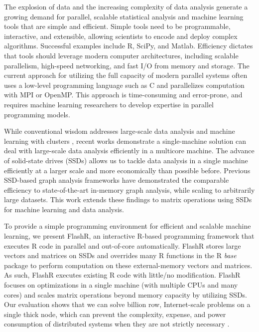 
The explosion of data and the increasing complexity of data analysis
generate a growing demand for parallel, scalable statistical analysis
and machine learning tools that are simple and efficient.
Simple tools need to be programmable, interactive, and extensible, 
allowing scientists to encode and deploy complex algorithms. 
Successful examples include R, SciPy, and Matlab.  Efficiency dictates that
tools should leverage modern computer architectures, including scalable
parallelism, high-speed networking, and fast I/O from memory and storage.
The current approach for utilizing the full
capacity of modern parallel systems often uses a low-level programming
language such as C and parallelizes computation with MPI or OpenMP.
This approach is time-consuming and error-prone, and requires machine learning
researchers to develop expertise in parallel programming models.
 

While conventional wisdom addresses large-scale data analysis and machine
learning with clusters
\cite{mapreduce,spark,systemml,tensorflow,petuum,graphlab}, recent works
\cite{flashgraph,gridgraph,Matveev17,hotos} demonstrate a single-machine
solution can deal with large-scale data analysis efficiently in a multicore
machine. The advance of solid-state drives (SSDs) allows us to tackle data
analysis in a single machine efficiently at a larger scale and more economically
than possible before. Previous SSD-based graph analysis frameworks
\cite{flashgraph, gridgraph, graphene}
have demonstrated the comparable efficiency to state-of-the-art in-memory graph
analysis, while scaling to arbitrarily large datasets. This work extends
these findings to matrix operations using SSDs for machine learning and
data analysis.


To provide a simple programming environment for efficient and scalable machine
learning, we present FlashR, an interactive R-based programming framework that
executes R code in parallel and out-of-core automatically. FlashR stores large
vectors and matrices on SSDs and overrides many R functions in the R
\textit{base} package to perform computation on these external-memory vectors
and matrices.
As such, FlashR executes existing R code with little/no modification.
FlashR focuses on optimizations in a single machine (with multiple CPUs and
many cores) and scales matrix operations beyond memory capacity by 
utilizing SSDs.
Our evaluation shows that we can solve billion row, Internet-scale 
problems on a single thick node, which can prevent the complexity,
expense, and power consumption of distributed systems when they are
not strictly necessary \cite{hotos}.

